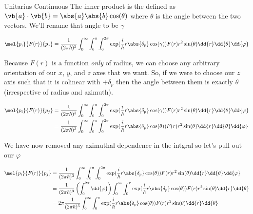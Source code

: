 \begin{answer}
\begin{answerpart}{Unitarius Continuous}
    The inner product is the defined as $\vb{a}\cdot\vb{b} =
    \abs{a}\abs{b}\cos(\theta)$ where $\theta$ is the angle between
    the two vectors.  We'll rename that angle to be $\gamma$

    \begin{equation}
      \begin{alignedat}{2}
        &&\mel{p_i}{F(r)}{p_j}
        &= \frac{1}{(2\pi\hbar)^3}\int_{0}^{\infty} \int_{0}^{\pi} \int_{0}^{2\pi}
        \exp(\frac{i}{\hbar}r\abs{\delta_p}\cos(\gamma))
        F(r)
        r^2 \sin(\theta) \dd{r}\dd{\theta}\dd{\varphi}
        \\
      \end{alignedat}
    \end{equation}

    Because $F(r)$ is a function \emph{only} of radius, we can choose
    any arbitrary orientation of our $x$, $y$, and $z$ axes that we
    want.  So, if we were to choose our $z$ axis such that it is
    colinear with $+\delta_p$ then the angle between them is exactly
    $\theta$ (irrespective of radius and azimuth).

    \begin{equation}
      \begin{alignedat}{2}
        &&\mel{p_i}{F(r)}{p_j}
        &= \frac{1}{(2\pi\hbar)^3}\int_{0}^{\infty} \int_{0}^{\pi} \int_{0}^{2\pi}
        \exp(\frac{i}{\hbar}r\abs{\delta_p}\cos(\gamma))
        F(r)
        r^2 \sin(\theta) \dd{r}\dd{\theta}\dd{\varphi}
        \\
        &&&= \frac{1}{(2\pi\hbar)^3}\int_{0}^{\infty} \int_{0}^{\pi} \int_{0}^{2\pi}
        \exp(\frac{i}{\hbar}r\abs{\delta_p}\cos(\theta))
        F(r)
        r^2 \sin(\theta) \dd{r}\dd{\theta}\dd{\varphi}
        \\
      \end{alignedat}
    \end{equation}

    We have now removed any azimuthal dependence in the intgral so
    let's pull out our $\varphi$
    
    \begin{equation}
      \begin{alignedat}{2}
        &&\mel{p_i}{F(r)}{p_j}
        &= \frac{1}{(2\pi\hbar)^3}\int_{0}^{\infty} \int_{0}^{\pi} \int_{0}^{2\pi}
        \exp(\frac{i}{\hbar}r\abs{\delta_p}\cos(\theta))
        F(r)
        r^2 \sin(\theta) \dd{r}\dd{\theta}\dd{\varphi}
        \\
        &&&= \frac{1}{(2\pi\hbar)^3}
        \left(\int_{0}^{2\pi} \dd{\varphi}\right)
        \int_{0}^{\infty} \int_{0}^{\pi}
        \exp(\frac{i}{\hbar}r\abs{\delta_p}\cos(\theta))
        F(r)
        r^2 \sin(\theta) \dd{r}\dd{\theta}
        \\
        &&&= 2\pi \frac{1}{(2\pi\hbar)^3}
        \int_{0}^{\infty} \int_{0}^{\pi}
        \exp(\frac{i}{\hbar}r\abs{\delta_p}\cos(\theta))
        F(r)
        r^2 \sin(\theta) \dd{r}\dd{\theta}
        \\
      \end{alignedat}
    \end{equation}


\end{answerpart}
\end{answer}
